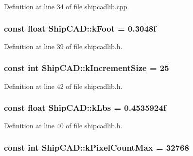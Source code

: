 Definition at line 34 of file shipcadlib.\-cpp.

\hypertarget{namespaceShipCAD_a8c1484188fed1e735c5a94f64a6817ab}{
\subsubsection[{k\-Foot}]{\setlength{\rightskip}{0pt plus 5cm}const float Ship\-C\-A\-D\-::k\-Foot = 0.\-3048f}}\label{namespaceShipCAD_a8c1484188fed1e735c5a94f64a6817ab}


Definition at line 39 of file shipcadlib.\-h.

\hypertarget{namespaceShipCAD_a1c0de7dc4306d7908bd8c6f7ff69ecdc}{
\subsubsection[{k\-Increment\-Size}]{\setlength{\rightskip}{0pt plus 5cm}const int Ship\-C\-A\-D\-::k\-Increment\-Size = 25}}\label{namespaceShipCAD_a1c0de7dc4306d7908bd8c6f7ff69ecdc}


Definition at line 42 of file shipcadlib.\-h.

\hypertarget{namespaceShipCAD_ad6937518d9742e268b279000d1e7a509}{
\subsubsection[{k\-Lbs}]{\setlength{\rightskip}{0pt plus 5cm}const float Ship\-C\-A\-D\-::k\-Lbs = 0.\-4535924f}}\label{namespaceShipCAD_ad6937518d9742e268b279000d1e7a509}


Definition at line 40 of file shipcadlib.\-h.

\hypertarget{namespaceShipCAD_ac8176e9d12f859826fb131b7febb8c8a}{
\subsubsection[{k\-Pixel\-Count\-Max}]{\setlength{\rightskip}{0pt plus 5cm}const int Ship\-C\-A\-D\-::k\-Pixel\-Count\-Max = 32768}}\label{namespaceShipCAD_ac8176e9d12f859826fb131b7febb8c8a}


